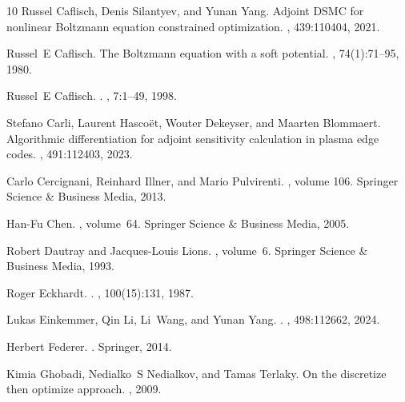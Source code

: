 \documentclass[12pt]{amsart}
\begin{document}
\begin{thebibliography}{10}
Russel Caflisch, Denis Silantyev, and Yunan Yang.
\newblock Adjoint {DSMC} for nonlinear {B}oltzmann equation constrained
  optimization.
, 439:110404, 2021.

Russel~E Caflisch.
\newblock The {B}oltzmann equation with a soft potential.
, 74(1):71--95, 1980.

Russel~E Caflisch.
.
, 7:1--49, 1998.

Stefano Carli, Laurent Hasco{\"e}t, Wouter Dekeyser, and Maarten Blommaert.
\newblock Algorithmic differentiation for adjoint sensitivity calculation in
  plasma edge codes.
, 491:112403, 2023.

Carlo Cercignani, Reinhard Illner, and Mario Pulvirenti.
, volume 106.
\newblock Springer Science \& Business Media, 2013.

Han-Fu Chen.
, volume~64.
\newblock Springer Science \& Business Media, 2005.

Robert Dautray and Jacques-Louis Lions.
, volume~6.
\newblock Springer Science \& Business Media, 1993.

Roger Eckhardt.
.
, 100(15):131, 1987.

Lukas Einkemmer, Qin Li, Li~Wang, and Yunan Yang.
.
, 498:112662, 2024.

Herbert Federer.
.
\newblock Springer, 2014.

Kimia Ghobadi, Nedialko~S Nedialkov, and Tamas Terlaky.
\newblock On the discretize then optimize approach.
, 2009.


\end{thebibliography}
\end{document}
